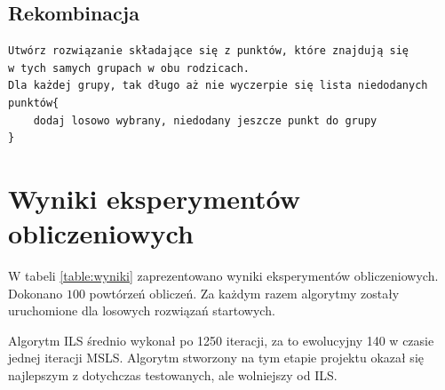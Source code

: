 \documentclass[main.tex]{subfiles}
\begin{document}
\subsection{Rekombinacja}
\begin{verbatim}
Utwórz rozwiązanie składające się z punktów, które znajdują się 
w tych samych grupach w obu rodzicach.
Dla każdej grupy, tak długo aż nie wyczerpie się lista niedodanych punktów{
    dodaj losowo wybrany, niedodany jeszcze punkt do grupy
}
\end{verbatim}

\section{Wyniki eksperymentów obliczeniowych}
\label{section:wyniki}

W tabeli \ref{table:wyniki} zaprezentowano wyniki eksperymentów obliczeniowych. Dokonano $100$ powtórzeń obliczeń. Za każdym razem algorytmy zostały uruchomione dla losowych rozwiązań startowych.
\begin{table}[H]
\centering
\caption{Wyniki eksperymentów obliczeniowych}
\label{table:wyniki}
\end{table}
Algorytm ILS średnio wykonał po 1250 iteracji, za to ewolucyjny 140 w czasie jednej iteracji MSLS.
Algorytm stworzony na tym etapie projektu okazał się najlepszym z dotychczas testowanych, ale wolniejszy od ILS.
\end{document}
